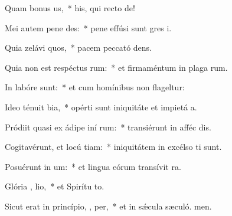 \item Quam bonus  us,~* his, qui recto  de!
\item Mei autem pene   des:~* pene effúsi sunt gres i.
\item Quia zelávi  quos,~* pacem peccató dens.
\item Quia non est respéctus  rum:~* et firmaméntum in plaga rum.
\item In labóre   sunt:~* et cum homínibus non flageltur:
\item Ideo ténuit  bia,~* opérti sunt iniquitáte et impietá a.
\item Pródiit quasi ex ádipe iní rum:~* transiérunt in afféc dis.
\item Cogitavérunt, et locú  tiam:~* iniquitátem in excélso ti sunt.
\item Posuérunt in   um:~* et lingua eórum transívit  ra.
\item Glória ,  lio,~* et Spirítu to.
\item Sicut erat in princípio,  ,  per,~* et in sǽcula sæculó. men.
